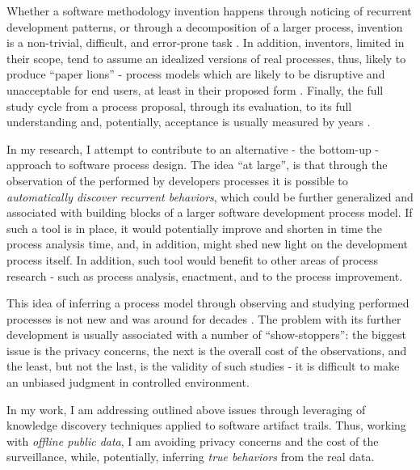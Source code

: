 \documentclass[11pt,oneside]{article}
\numberwithin{equation}{subsection}
\begin{document}
Whether a software methodology invention happens through noticing of recurrent development
patterns, or through a decomposition of a larger process, invention is a non-trivial, difficult,
and error-prone task \cite{citeulike:5043104}. In addition, inventors, limited in their scope, 
tend to assume an idealized versions of real processes, thus, likely to produce ``paper lions''
- process models which are likely to be disruptive and unacceptable for end users, at least 
in their proposed form \cite{citeulike:9758924}. Finally, the full study cycle from a process
proposal, through its evaluation, to its full understanding and, potentially, acceptance is usually
measured by years \cite{citeulike:113403}.

In my research, I attempt to contribute to an alternative - the bottom-up - approach to software
process design. The idea ``at large'', is that through the observation of the performed 
by developers processes it is possible to \textit{automatically discover recurrent behaviors}, which
could be further generalized and associated with building blocks of a larger software development
process model. If such a tool is in place, it would potentially improve and shorten in time the
process analysis time, and, in addition, might shed new light on the development process itself.
In addition, such tool would benefit to other areas of process research - such as process
analysis, enactment, and to the process improvement.

This idea of inferring a process model through observing and studying performed processes is
not new and was around for decades \cite{citeulike:328044}. The problem with its further
development is usually associated with a number of ``show-stoppers'': the biggest issue is the
privacy concerns, the next is the overall cost of the observations, and the least, but not
the last, is the validity of such studies - it is difficult to make an unbiased judgment in
controlled environment. 

In my work, I am addressing outlined above issues through leveraging of knowledge
discovery techniques applied to software artifact trails. Thus, working with \textit{offline
public data}, I am avoiding privacy concerns and the cost of the surveillance, while, potentially, 
inferring \textit{true behaviors} from the real data.
\end{document}
